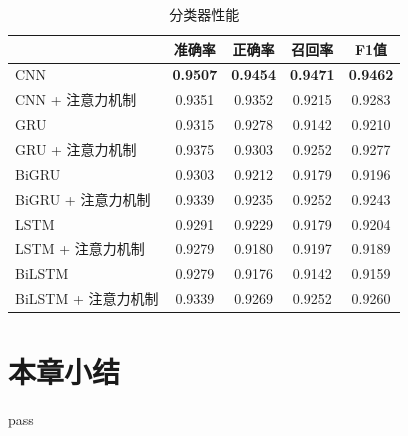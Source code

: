 \begin{table}[htb]
  \centering
  \begin{minipage}[t]{0.8\linewidth}
  \caption{分类器性能}
  \label{tab:exp_context_emo_tri_result}
    \begin{tabularx}{\linewidth}{X|cccc}
    \toprule[1.5pt]
    & 准确率 & 正确率 & 召回率 & F1值 \\
    \hline
    CNN & \bf 0.9507 & \bf 0.9454 & \bf 0.9471 & \bf 0.9462 \\ %
    CNN + 注意力机制 & 0.9351 & 0.9352 & 0.9215 & 0.9283 \\ %
    \hline
    GRU & 0.9315 & 0.9278 & 0.9142 & 0.9210 \\ %
    GRU + 注意力机制 & 0.9375 & 0.9303 & 0.9252 & 0.9277 \\ %
    \hline
    BiGRU & 0.9303 & 0.9212 & 0.9179 & 0.9196 \\ %
    BiGRU + 注意力机制 & 0.9339 & 0.9235 & 0.9252 & 0.9243 \\ %
    \hline
    LSTM & 0.9291 & 0.9229 & 0.9179 & 0.9204 \\ %
    LSTM + 注意力机制 & 0.9279 & 0.9180 & 0.9197 & 0.9189 \\ %
    \hline
    BiLSTM & 0.9279 & 0.9176 & 0.9142 & 0.9159 \\ %
    BiLSTM + 注意力机制 & 0.9339 & 0.9269 & 0.9252 & 0.9260 \\ %
    \bottomrule[1.5pt]
    \end{tabularx}
  \end{minipage}
\end{table}

\section{本章小结}

pass

